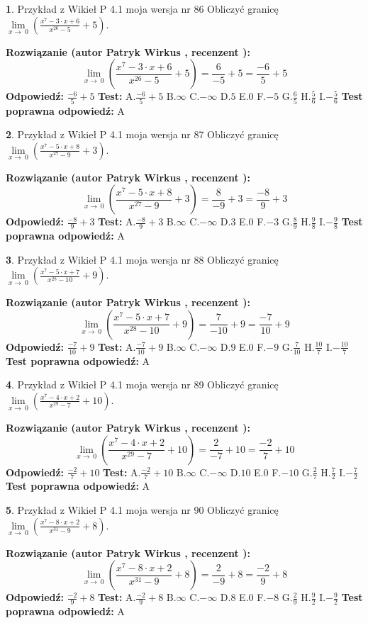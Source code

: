 \documentclass[12pt, a4paper]{article}
\theoremstyle{definition} %
\newtheorem{zad}{}
\newcommand{\zadStart}[1]{\begin{zad}#1\newline}
\newcommand{\zadStop}{\end{zad}}
\newcommand{\rozwStart}[2]{\noindent \textbf{Rozwiązanie (autor #1 , recenzent #2): }\newline}
\newcommand{\rozwStop}{\newline}
\newcommand{\odpStart}{\noindent \textbf{Odpowiedź:}\newline}
\newcommand{\odpStop}{\newline}
\newcommand{\testStart}{\noindent \textbf{Test:}\newline}
\newcommand{\testStop}{\newline}
\newcommand{\kluczStart}{\noindent \textbf{Test poprawna odpowiedź:}\newline}
\newcommand{\kluczStop}{\newline}
\begin{document}
\zadStart{Przykład z Wikieł P 4.1 moja wersja nr 86}
Obliczyć granicę $\lim\limits_{x\to\ 0}(\frac{x^{7}-3 \cdot x +6}{x^{26}-5}+5)$.
\zadStop
\rozwStart{Patryk Wirkus}{}
$$\lim\limits_{x\to\ 0}(\frac{x^{7}-3 \cdot x +6}{x^{26}-5}+5)=\frac{6}{-5}+5=\frac{-6}{5}+5$$
\rozwStop
\odpStart
$\frac{-6}{5}+5$
\odpStop
\testStart
A.$\frac{-6}{5}+5$
B.$\infty$
C.$-\infty$
D.$5$
E.$0$
F.$-5$
G.$\frac{6}{5}$
H.$\frac{5}{6}$
I.$-\frac{5}{6}$
\testStop
\kluczStart
A
\kluczStop



\zadStart{Przykład z Wikieł P 4.1 moja wersja nr 87}
Obliczyć granicę $\lim\limits_{x\to\ 0}(\frac{x^{7}-5 \cdot x +8}{x^{27}-9}+3)$.
\zadStop
\rozwStart{Patryk Wirkus}{}
$$\lim\limits_{x\to\ 0}(\frac{x^{7}-5 \cdot x +8}{x^{27}-9}+3)=\frac{8}{-9}+3=\frac{-8}{9}+3$$
\rozwStop
\odpStart
$\frac{-8}{9}+3$
\odpStop
\testStart
A.$\frac{-8}{9}+3$
B.$\infty$
C.$-\infty$
D.$3$
E.$0$
F.$-3$
G.$\frac{8}{9}$
H.$\frac{9}{8}$
I.$-\frac{9}{8}$
\testStop
\kluczStart
A
\kluczStop



\zadStart{Przykład z Wikieł P 4.1 moja wersja nr 88}
Obliczyć granicę $\lim\limits_{x\to\ 0}(\frac{x^{7}-5 \cdot x +7}{x^{28}-10}+9)$.
\zadStop
\rozwStart{Patryk Wirkus}{}
$$\lim\limits_{x\to\ 0}(\frac{x^{7}-5 \cdot x +7}{x^{28}-10}+9)=\frac{7}{-10}+9=\frac{-7}{10}+9$$
\rozwStop
\odpStart
$\frac{-7}{10}+9$
\odpStop
\testStart
A.$\frac{-7}{10}+9$
B.$\infty$
C.$-\infty$
D.$9$
E.$0$
F.$-9$
G.$\frac{7}{10}$
H.$\frac{10}{7}$
I.$-\frac{10}{7}$
\testStop
\kluczStart
A
\kluczStop



\zadStart{Przykład z Wikieł P 4.1 moja wersja nr 89}
Obliczyć granicę $\lim\limits_{x\to\ 0}(\frac{x^{7}-4 \cdot x +2}{x^{29}-7}+10)$.
\zadStop
\rozwStart{Patryk Wirkus}{}
$$\lim\limits_{x\to\ 0}(\frac{x^{7}-4 \cdot x +2}{x^{29}-7}+10)=\frac{2}{-7}+10=\frac{-2}{7}+10$$
\rozwStop
\odpStart
$\frac{-2}{7}+10$
\odpStop
\testStart
A.$\frac{-2}{7}+10$
B.$\infty$
C.$-\infty$
D.$10$
E.$0$
F.$-10$
G.$\frac{2}{7}$
H.$\frac{7}{2}$
I.$-\frac{7}{2}$
\testStop
\kluczStart
A
\kluczStop



\zadStart{Przykład z Wikieł P 4.1 moja wersja nr 90}
Obliczyć granicę $\lim\limits_{x\to\ 0}(\frac{x^{7}-8 \cdot x +2}{x^{31}-9}+8)$.
\zadStop
\rozwStart{Patryk Wirkus}{}
$$\lim\limits_{x\to\ 0}(\frac{x^{7}-8 \cdot x +2}{x^{31}-9}+8)=\frac{2}{-9}+8=\frac{-2}{9}+8$$
\rozwStop
\odpStart
$\frac{-2}{9}+8$
\odpStop
\testStart
A.$\frac{-2}{9}+8$
B.$\infty$
C.$-\infty$
D.$8$
E.$0$
F.$-8$
G.$\frac{2}{9}$
H.$\frac{9}{2}$
I.$-\frac{9}{2}$
\testStop
\kluczStart
A
\kluczStop
\end{document}
